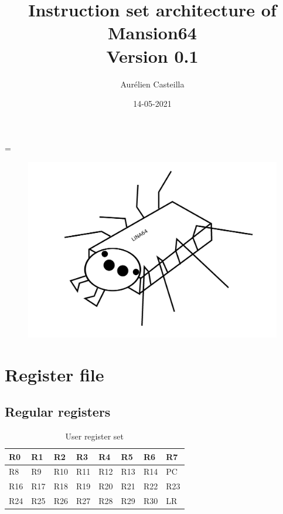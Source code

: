 \documentclass[11pt]{article}
\author{Aurélien Casteilla}
\title{Instruction set architecture of Mansion64 \\[1ex] \large Version 0.1}
\date{14-05-2021}
\begin{document}
\emergencystretch=\maxdimen
{}

\maketitle
\begin{figure}[h!]
    \includegraphics[width=\linewidth]{mascotte.png}
\end{figure}
\newpage

\tableofcontents
\newpage

\section{Register file}
\subsection{Regular registers}

\begin{table}[h!]
    \begin{center}
        \caption{User register set}
        \label{tab:urs}
        \begin{tabular}{|l|l|l|l|l|l|l|l|}
            \hline
            R0  & R1    & R2    & R3    & R4    & R5    & R6    & R7 \\
            \hline
            R8    & R9    & R10   & R11   & R12   & R13   & R14  & PC \\
            \hline
            R16  & R17    & R18    & R19    & R20    & R21    & R22    & R23 \\
            \hline
            R24    & R25    & R26   & R27   & R28   & R29   & R30   & LR \\
            \hline
        \end{tabular}
    \end{center}
\end{table}
\end{document}
